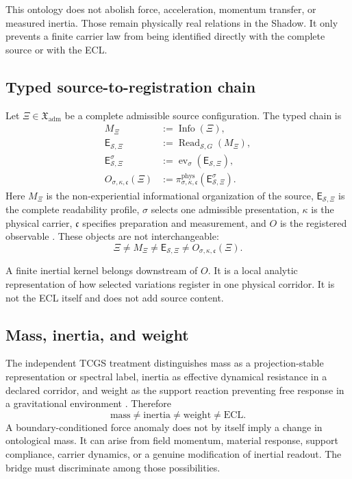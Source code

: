 \documentclass[11pt]{article}
\newcommand{\Sset}{\mathcal{S}}
\newcommand{\ECL}{\mathsf{E}}
\newcommand{\Info}{\operatorname{Info}}
\newcommand{\Read}{\operatorname{Read}_{\Sset,G}}
\newcommand{\ev}{\operatorname{ev}}
\newcommand{\phys}{\operatorname{phys}}
\newcommand{\Corridor}{\mathfrak{c}}
\newcommand{\Carrier}{\kappa}
\newcommand{\Selector}{\sigma}
\begin{document}
This ontology does not abolish force, acceleration, momentum transfer, or measured inertia. Those remain physically real relations in the Shadow. It only prevents a finite carrier law from being identified directly with the complete source or with the ECL.

\subsection{Typed source-to-registration chain}

Let \(\Xi\in\mathfrak X_{\mathrm{adm}}\) be a complete admissible source configuration. The typed chain is
\begin{align}
M_{\Xi}&:=\Info(\Xi),\\
\ECL_{\Sset,\Xi}&:=\Read(M_{\Xi}),\\
\ECL^{\Selector}_{\Sset,\Xi}&:=\ev_{\Selector}(\ECL_{\Sset,\Xi}),\\
O_{\Selector,\Carrier,\Corridor}(\Xi)
&:=\pi^{\phys}_{\Selector,\Carrier,\Corridor}
  \left(\ECL^{\Selector}_{\Sset,\Xi}\right).
\label{eq:typed_chain}
\end{align}
Here \(M_{\Xi}\) is the non-experiential informational organization of the source, \(\ECL_{\Sset,\Xi}\) is the complete readability profile, \(\Selector\) selects one admissible presentation, \(\Carrier\) is the physical carrier, \(\Corridor\) specifies preparation and measurement, and \(O\) is the registered observable \cite{ArellanoECL2026,ArellanoInfoECL2026}. These objects are not interchangeable:
\begin{equation}
\Xi\neq M_{\Xi}\neq \ECL_{\Sset,\Xi}
\neq O_{\Selector,\Carrier,\Corridor}(\Xi).
\end{equation}

A finite inertial kernel belongs downstream of \(O\). It is a local analytic representation of how selected variations register in one physical corridor. It is not the ECL itself and does not add source content.

\subsection{Mass, inertia, and weight}

The independent TCGS treatment distinguishes mass as a projection-stable representation or spectral label, inertia as effective dynamical resistance in a declared corridor, and weight as the support reaction preventing free response in a gravitational environment \cite{ArellanoMassInertia2026}. Therefore
\begin{equation}
\text{mass}\neq\text{inertia}\neq\text{weight}\neq\text{ECL}.
\label{eq:mass_inertia_weight}
\end{equation}
A boundary-conditioned force anomaly does not by itself imply a change in ontological mass. It can arise from field momentum, material response, support compliance, carrier dynamics, or a genuine modification of inertial readout. The bridge must discriminate among those possibilities.
\end{document}
